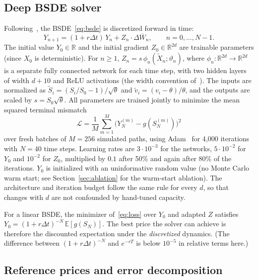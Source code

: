 \subsection{Deep BSDE solver}\label{sec:solver}
Following~\cite{han2018solving}, the BSDE~\eqref{eq:bsde} is discretized forward in time:
\begin{equation}\label{eq:recursion}
  Y_{n+1} = (1+r\Delta t)\,Y_n + Z_n\cdot\Delta\overline W_n,\qquad n=0,\dots,N-1.
\end{equation}
The initial value $Y_0\in\mathbb R$ and the initial gradient $Z_0\in\mathbb R^{2d}$ are trainable parameters (since $X_0$ is deterministic). For $n\ge1$, $Z_n=s\,\phi_n(\tilde X_n;\vartheta_n)$, where $\phi_n:\mathbb R^{2d}\to\mathbb R^{2d}$ is a separate fully connected network for each time step, with two hidden layers of width $d+10$ and ReLU activations (the width convention of~\cite{han2018solving}). The inputs are normalized as $\tilde S_i=(S_i/S_0-1)/\sqrt\theta$ and $\tilde v_i=(v_i-\theta)/\theta$, and the outputs are scaled by $s=S_0\sqrt\theta$. All parameters are trained jointly to minimize the mean squared terminal mismatch
\begin{equation}\label{eq:loss}
  \mathcal L = \frac1M\sum_{m=1}^{M}\bigl(Y_N^{(m)}-g(S_N^{(m)})\bigr)^2
\end{equation}
over fresh batches of $M=256$ simulated paths, using Adam~\cite{kingma2015adam} for 4{,}000 iterations with $N=40$ time steps. Learning rates are $3\cdot10^{-3}$ for the networks, $5\cdot10^{-2}$ for $Y_0$ and $10^{-2}$ for $Z_0$, multiplied by $0.1$ after 50\% and again after 80\% of the iterations. $Y_0$ is initialized with an uninformative random value (no Monte Carlo warm start; see Section~\ref{sec:ablation} for the warm-start ablation). The architecture and iteration budget follow the same rule for every $d$, so that changes with $d$ are not confounded by hand-tuned capacity.

For a linear BSDE, the minimizer of~\eqref{eq:loss} over $Y_0$ and adapted $Z$ satisfies $Y_0=(1+r\Delta t)^{-N}\,\mathbb E[g(S_N)]$. The best price the solver can achieve is therefore the discounted expectation under the \emph{discretized} dynamics. (The difference between $(1+r\Delta t)^{-N}$ and $e^{-rT}$ is below $10^{-5}$ in relative terms here.)

\subsection{Reference prices and error decomposition}\label{sec:refs}
